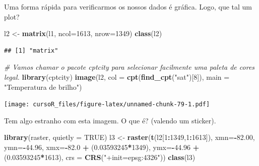 \documentclass[]{book}
\newenvironment{Shaded}{\begin{snugshade}}{\end{snugshade}}
\newcommand{\KeywordTok}[1]{\textcolor[rgb]{0.13,0.29,0.53}{\textbf{#1}}}
\newcommand{\DataTypeTok}[1]{\textcolor[rgb]{0.13,0.29,0.53}{#1}}
\newcommand{\DecValTok}[1]{\textcolor[rgb]{0.00,0.00,0.81}{#1}}
\newcommand{\FloatTok}[1]{\textcolor[rgb]{0.00,0.00,0.81}{#1}}
\newcommand{\StringTok}[1]{\textcolor[rgb]{0.31,0.60,0.02}{#1}}
\newcommand{\CommentTok}[1]{\textcolor[rgb]{0.56,0.35,0.01}{\textit{#1}}}
\newcommand{\OtherTok}[1]{\textcolor[rgb]{0.56,0.35,0.01}{#1}}
\newcommand{\OperatorTok}[1]{\textcolor[rgb]{0.81,0.36,0.00}{\textbf{#1}}}
\newcommand{\NormalTok}[1]{#1}
\theoremstyle{definition}
\theoremstyle{definition}
\theoremstyle{definition}
\theoremstyle{remark}
\begin{document}
Uma forma rápida para verificarmos os nossos dados é gráfica. Logo, que
tal um plot?

\begin{Shaded}
\begin{Highlighting}[]
\NormalTok{l2 <-}\StringTok{ }\KeywordTok{matrix}\NormalTok{(l1, }\DataTypeTok{ncol=}\DecValTok{1613}\NormalTok{, }\DataTypeTok{nrow=}\DecValTok{1349}\NormalTok{)}
\KeywordTok{class}\NormalTok{(l2)}
\end{Highlighting}
\end{Shaded}

\begin{verbatim}
## [1] "matrix"
\end{verbatim}

\begin{Shaded}
\begin{Highlighting}[]
\CommentTok{# Vamos chamar o pacote cptcity para selecionar facilmente uma paleta de cores legal.}
\KeywordTok{library}\NormalTok{(cptcity)   }
\KeywordTok{image}\NormalTok{(l2,}
      \DataTypeTok{col =} \KeywordTok{cpt}\NormalTok{(}\KeywordTok{find_cpt}\NormalTok{(}\StringTok{"sat"}\NormalTok{)[}\DecValTok{8}\NormalTok{]),}
      \DataTypeTok{main =} \StringTok{"Temperatura de brilho"}\NormalTok{) }
\end{Highlighting}
\end{Shaded}

\texttt{[image: cursoR\_files/figure-latex/unnamed-chunk-79-1.pdf]}

Tem algo estranho com esta imagem. O que é? (valendo um sticker).

\begin{Shaded}
\begin{Highlighting}[]
\KeywordTok{library}\NormalTok{(raster, }\DataTypeTok{quietly =} \OtherTok{TRUE}\NormalTok{)}
\NormalTok{l3 <-}\StringTok{ }\KeywordTok{raster}\NormalTok{(}\KeywordTok{t}\NormalTok{(l2[}\DecValTok{1}\OperatorTok{:}\DecValTok{1349}\NormalTok{,}\DecValTok{1}\OperatorTok{:}\DecValTok{1613}\NormalTok{]),}
                     \DataTypeTok{xmn=}\OperatorTok{-}\FloatTok{82.00}\NormalTok{,}
                     \DataTypeTok{ymn=}\OperatorTok{-}\FloatTok{44.96}\NormalTok{,}
                     \DataTypeTok{xmx=}\OperatorTok{-}\FloatTok{82.0}  \OperatorTok{+}\StringTok{ }\NormalTok{(}\FloatTok{0.03593245}\OperatorTok{*}\DecValTok{1349}\NormalTok{), }
                     \DataTypeTok{ymx=}\OperatorTok{-}\FloatTok{44.96} \OperatorTok{+}\StringTok{ }\NormalTok{(}\FloatTok{0.03593245}\OperatorTok{*}\DecValTok{1613}\NormalTok{),}
                     \DataTypeTok{crs =} \KeywordTok{CRS}\NormalTok{(}\StringTok{"+init=epsg:4326"}\NormalTok{))}
\KeywordTok{class}\NormalTok{(l3)}
\end{Highlighting}
\end{Shaded}
\end{document}
